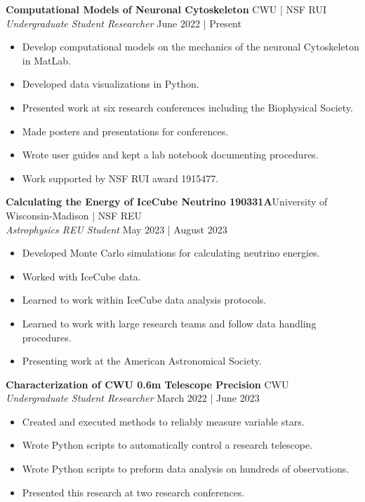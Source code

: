 \documentclass[a4paper,9pt]{extarticle}
\begin{document}
\noindent\textbf{Computational Models of Neuronal Cytoskeleton} \hfill CWU | NSF RUI\\
\textit{Undergraduate Student Researcher} \hfill June 2022 | Present
\begin{itemize}
    \item Develop computational models on the mechanics of the neuronal Cytoskeleton in MatLab.
    \item Developed data visualizations in Python.
    \item Presented work at six research conferences including the Biophysical Society.
    \item Made posters and presentations for conferences.
    \item Wrote user guides and kept a lab notebook documenting procedures.
    \item Work supported by NSF RUI award 1915477.
\end{itemize}

\noindent\textbf{Calculating the Energy of IceCube Neutrino 190331A}\hfill University of Wisconsin-Madison | NSF REU\\
\textit{Astrophysics REU Student} \hfill May 2023 | August 2023
\begin{itemize}
    \item Developed Monte Carlo simulations for calculating neutrino energies.
    \item Worked with IceCube data.
    \item Learned to work within IceCube data analysis protocols.
    \item Learned to work with large research teams and follow data handling procedures.
    \item Presenting work at the American Astronomical Society.
\end{itemize}

\noindent\textbf{Characterization of CWU 0.6m Telescope Precision} \hfill CWU\\
\textit{Undergraduate Student Researcher} \hfill March 2022 | June 2023
\begin{itemize}
    \item Created and executed methods to reliably measure variable stars.
    \item Wrote Python scripts to automatically control a research telescope.
    \item Wrote Python scripts to preform data analysis on hundreds of observations.
    \item Presented this research at two research conferences.
\end{itemize}
\end{document}
